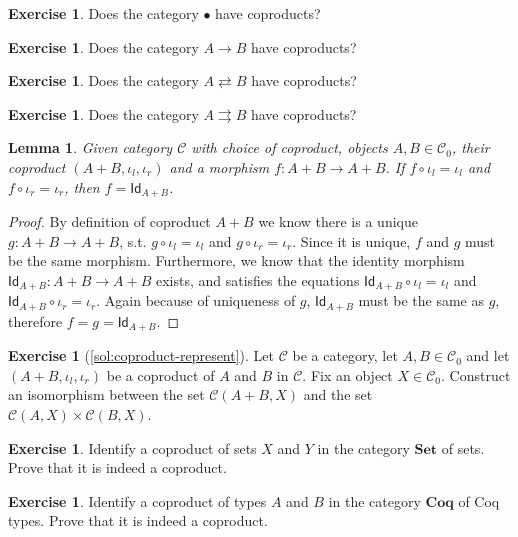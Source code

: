 \documentclass[a4paper,11pt, oneside,titlepage=false]{scrbook}
\theoremstyle{plain}
\newtheorem{lemma}[thm]{Lemma}
\theoremstyle{definition}
\newtheorem{exer}[thm]{Exercise}
\newcommand{\cfont}[1]{\ensuremath{\mathsf{#1}}}
\newcommand{\Cat}[1]{\mathcal{#1}}
\newcommand{\CC}{\Cat{C}}
\newcommand{\Catb}[1]{\mathbf{#1}}
\newcommand{\SET}{\Catb{Set}}
\newcommand{\COQ}{\Catb{Coq}}
\newcommand{\Ob}[1]{{#1}_0}
\newcommand{\Id}[1][]{\cfont{Id}_{#1}}
\newcommand{\inl}{\ensuremath{\iota_l}}
\newcommand{\inr}{\ensuremath{\iota_r}}
\newcommand{\co}[2]{\ensuremath{#2 \circ #1}}
\begin{document}
\begin{exer}
  Does the category $\bullet$ have coproducts?
\end{exer}

\begin{exer}
  Does the category $A \to B$ have coproducts?
\end{exer}

\begin{exer}
  Does the category $A \rightleftarrows B$ have coproducts?
\end{exer}

\begin{exer}
  Does the category $A \rightrightarrows B$ have coproducts?
\end{exer}


\begin{lemma}
\label{lemma}
Given category $\CC$ with choice of coproduct, objects $A,B\in \Ob{\CC}$, their coproduct $(A+B,\inl,\inr)$ and a morphism $f:A+B\to A+B$. If $\co {\inl} {f}=\inl$ and $\co {\inr} {f}=\inr$, then $f=\Id[A+B]$.
\end{lemma}
\begin{proof}
By definition of coproduct $A+B$ we know there is a unique $g: A+B \to A+B$, s.t. $\co {\inl} {g}=\inl$ and $\co {\inr} {g}=\inr$. Since it is unique, $f$ and $g$ must be the same morphism. Furthermore, we know that the identity morphism $\Id[A+B]: A+B \to A+B$ exists, and satisfies the equations $\co {\inl} {\Id[A+B]} = \inl$ and $\co {\inr} {\Id[A+B]} = \inr$. Again because of uniqueness of $g$, $\Id[A+B]$ must be the same as $g$, therefore $f=g=\Id[A+B]$.
\end{proof}


\begin{exer}[\cref{sol:coproduct-represent}] \label{exer:coproduct-represent}
Let $\CC$ be a category, let $A,B\in\Ob{\CC}$ and let $(A+B,\inl,\inr)$ be a coproduct of $A$ and $B$ in $\CC$. Fix an object $X\in\Ob{\CC}$. Construct an isomorphism between the set $\CC(A+B,X)$ and the set $\CC(A,X)\times\CC(B,X)$.
\end{exer}



\begin{exer}\label{exer:coproduct_set}
  Identify a coproduct of sets $X$ and $Y$ in the category $\SET$ of sets.
  Prove that it is indeed a coproduct.
\end{exer}

\begin{exer}
  Identify a coproduct of types $A$ and $B$ in the category $\COQ$ of Coq types.
  Prove that it is indeed a coproduct.
\end{exer}
\end{document}
